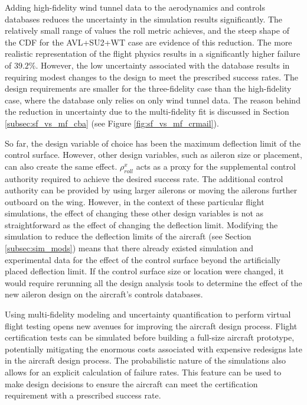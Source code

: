 Adding high-fidelity wind tunnel data to the aerodynamics and controls databases reduces the uncertainty in the simulation results significantly. 
The relatively small range of values the roll metric achieves, and the steep shape of the CDF for the AVL+SU2+WT case are evidence of this reduction.
The more realistic representation of the flight physics results in a significantly higher failure of $39.2\%$. 
However, the low uncertainty associated with the database results in requiring modest changes to the design to meet the prescribed success rates.
The design requirements are smaller for the three-fidelity case than the high-fidelity case, where the database only relies on only wind tunnel data.
The reason behind the reduction in uncertainty due to the multi-fidelity fit is discussed in Section \ref{subsec:sf_vs_mf_cba} (see Figure \ref{fig:sf_vs_mf_crmail}).

So far, the design variable of choice has been the maximum deflection limit of the control surface. 
However, other design variables, such as aileron size or placement, can also create the same effect.
$\rho_{roll}^x$ acts as a proxy for the supplemental control authority required to achieve the desired success rate. 
The additional control authority can be provided by using larger ailerons or moving the ailerons further outboard on the wing. 
However, in the context of these particular flight simulations, the effect of changing these other design variables is not as straightforward as the effect of changing the deflection limit.
Modifying the simulation to reduce the deflection limits of the aircraft (see Section \ref{subsec:sim_mods}) means that there already existed simulation and experimental data for the effect of the control surface beyond the artificially placed deflection limit. 
If the control surface size or location were changed, it would require rerunning all the design analysis tools to determine the effect of the new aileron design on the aircraft's controls databases. 

Using multi-fidelity modeling and uncertainty quantification to perform virtual flight testing opens new avenues for improving the aircraft design process. 
Flight certification tests can be simulated before building a full-size aircraft prototype, potentially mitigating the enormous costs associated with expensive redesigns late in the aircraft design process.
The probabilistic nature of the simulations also allows for an explicit calculation of failure rates.
This feature can be used to make design decisions to ensure the aircraft can meet the certification requirement with a prescribed success rate. 